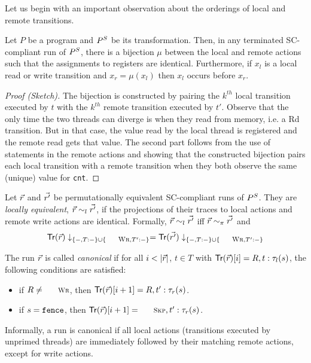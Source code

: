 Let us begin with an important observation about the orderings of local and remote transitions.
\begin{lemma}\label{lem:transformation-bijection}
Let $P$ be a program and $P^S$ be its transformation.
Then, in any terminated SC-compliant run of $P^S$, there is a bijection $\mu$ between the local and remote actions such that the assignments to registers are identical.
Furthermore, if $x_l$ is a local read or write transition and $x_r=\mu(x_l)$ then $x_l$ occurs before $x_r$.
\end{lemma}
\begin{proof}[Proof (Sketch)]
The bijection is constructed by pairing the $k^{th}$ local transition executed by $t$ with the $k^{th}$ remote transition executed by $t'$.
Observe that the only time the two threads can diverge is when they read from memory, i.e. a {\sc\small Rd} transition.
But in that case, the value read by the local thread is registered and the remote read gets that value.
The second part follows from the use of {\aliassume} statements in the remote actions and showing that the constructed bijection pairs each local transition with a remote transition when they both observe the same (unique) value for {\tt cnt}.
\end{proof}

Let $\vec{r}$ and $\vec{r'}$ be permutationally equivalent SC-compliant runs of $P^S$.
They are {\em locally equivalent}, $\vec{r}\sim_l \vec{r'}$, if the projections of their traces to local actions and remote write actions are identical.
Formally, $\vec{r}\sim_l \vec{r'}$ iff $\vec{r}\sim_{\pi} \vec{r'}$ and
\[
\alitracex {\alisequencex r}\downarrow_{\{-,T:-\}\cup\{\textnormal{\sc\small Wr},T':-\}} = \alitracex {\alisequencex {r'}}\downarrow_{\{-,T:-\}\cup\{\textnormal{\sc\small Wr},T':-\}}
\]

The run $\vec{r}$ is called {\em canonical} if for all $i<|\alisequencex {r}|$, $t\in T$ with $\mathsf{Tr}(\vec{r})[i]=R,t:\tau_{l}(s)$, the following conditions are satisfied:
\begin{itemize}
\item if $R\neq\textnormal{\sc\small Wr}$, then $\mathsf{Tr}(\vec{r})[i+1]=R,t':\tau_{r}(s)$.
\item if $s=\mathtt{fence}$, then $\alitracex {\alisequencex {r}}[i+1]=\textnormal{\sc\small Skp},t':\aliremtransx s$.
\end{itemize}
Informally, a run is canonical if all local actions (transitions executed by unprimed threads) are immediately followed by their matching remote actions, except for write actions.

